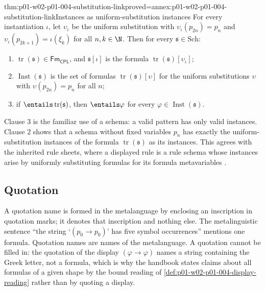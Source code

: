 \begin{hbtheorem}{thm:p01-w02-p01-004-substitution-link}{proved=annex:p01-w02-p01-004-substitution-link}{Instances as uniform-substitution instances}
For every instantiation \(\iota\), let \(\upsilon_\iota\) be the uniform
substitution with \(\upsilon_\iota(p_{2n})=p_n\) and
\(\upsilon_\iota(p_{2k+1})=\iota(\xi_k)\) for all \(n,k\in\N\). Then for every
\(\mathfrak s\in\mathrm{Sch}\):
\begin{enumerate}
  \item \(\operatorname{tr}(\mathfrak s)\in\mathsf{Fm}_{\mathsf{CPL}}\),
        and \(\mathfrak s[\iota]\) is the formula
        \(\operatorname{tr}(\mathfrak s)[\upsilon_\iota]\);
  \item \(\operatorname{Inst}(\mathfrak s)\) is the set of formulas
        \(\operatorname{tr}(\mathfrak s)[\upsilon]\) for the uniform
        substitutions \(\upsilon\) with \(\upsilon(p_{2n})=p_n\) for all
        \(n\);
  \item if \(\entails\operatorname{tr}(\mathfrak s)\), then
        \(\entails\varphi\) for every
        \(\varphi\in\operatorname{Inst}(\mathfrak s)\).
\end{enumerate}
\end{hbtheorem}

Clause 3 is the familiar use of a schema: a valid pattern has only valid
instances. Clause 2 shows that a schema without fixed variables \(p_n\) has
exactly the uniform-substitution instances of the formula
\(\operatorname{tr}(\mathfrak s)\) as its instances. This agrees with the
inherited rule sheets, where a displayed rule is a rule schema whose
instances arise by uniformly substituting formulas for its formula
metavariables \cite[ch.~``Rule Sheets'', section ``Classical natural
deduction'']{FrozenFormalLogicSchemasCodes}.

\subsection{Quotation}
\label{sec:p01-w02-p01-004-quotation}

A quotation name is formed in the metalanguage by enclosing an inscription in
quotation marks; it denotes that inscription and nothing else. The
metalinguistic sentence ``the string \(\text{`}(p_0\to p_0)\text{'}\) has
five symbol occurrences'' mentions one formula. Quotation names are names of
the metalanguage. A quotation cannot be filled in: the quotation of the
display \((\varphi\to\varphi)\) names a string containing the Greek letter,
not a formula, which is why the handbook states claims about all formulas of
a given shape by the bound reading of
\cref{def:p01-w02-p01-004-display-reading} rather than by quoting a display.

